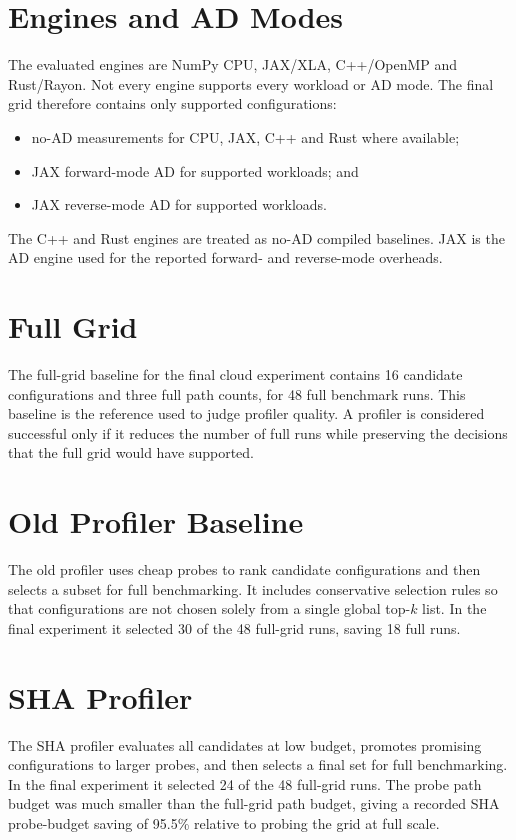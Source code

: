\section{Engines and AD Modes}

The evaluated engines are NumPy CPU, JAX/XLA, C++/OpenMP and Rust/Rayon. Not every engine supports every workload or AD mode. The final grid therefore contains only supported configurations:
\begin{itemize}
    \item no-AD measurements for CPU, JAX, C++ and Rust where available;
    \item JAX forward-mode AD for supported workloads; and
    \item JAX reverse-mode AD for supported workloads.
\end{itemize}

The C++ and Rust engines are treated as no-AD compiled baselines. JAX is the AD engine used for the reported forward- and reverse-mode overheads.

\section{Full Grid}

The full-grid baseline for the final  cloud experiment contains 16 candidate configurations and three full path counts, for 48 full benchmark runs. This baseline is the reference used to judge profiler quality. A profiler is considered successful only if it reduces the number of full runs while preserving the decisions that the full grid would have supported.

\section{Old Profiler Baseline}

The old profiler uses cheap probes to rank candidate configurations and then selects a subset for full benchmarking. It includes conservative selection rules so that configurations are not chosen solely from a single global top-\(k\) list. In the final experiment it selected 30 of the 48 full-grid runs, saving 18 full runs.

\section{SHA Profiler}

The SHA profiler evaluates all candidates at low budget, promotes promising configurations to larger probes, and then selects a final set for full benchmarking. In the final experiment it selected 24 of the 48 full-grid runs. The probe path budget was much smaller than the full-grid path budget, giving a recorded SHA probe-budget saving of 95.5\% relative to probing the grid at full scale.

